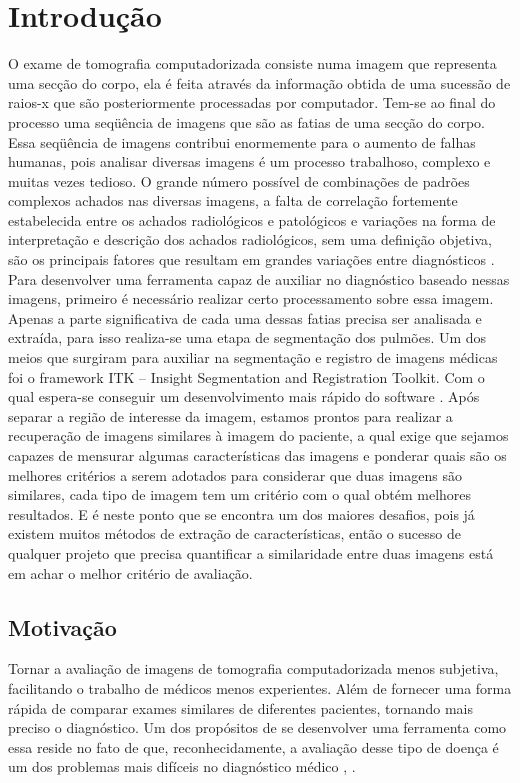 \chapter{Introdução}

O exame de tomografia computadorizada consiste numa imagem que representa uma secção do corpo, ela é feita através da informação obtida de uma sucessão de raios-x que são posteriormente processadas por computador. Tem-se ao final do processo uma seqüência de imagens que são as fatias de uma secção do corpo. Essa seqüência de imagens contribui enormemente para o aumento de falhas humanas, pois analisar diversas imagens é um processo trabalhoso, complexo e muitas vezes tedioso. O grande número possível de combinações de padrões complexos achados nas diversas imagens, a falta de correlação fortemente estabelecida entre os achados radiológicos e patológicos e variações na forma de interpretação e descrição dos achados radiológicos, sem uma definição objetiva, são os principais fatores que resultam em grandes variações entre diagnósticos \cite{uchiyama}.
Para desenvolver uma ferramenta capaz de auxiliar no diagnóstico baseado nessas imagens, primeiro é necessário realizar certo processamento sobre essa imagem. Apenas a parte significativa de cada uma dessas fatias precisa ser analisada e extraída, para isso realiza-se uma etapa de segmentação dos pulmões. Um dos meios que surgiram para auxiliar na segmentação e registro de imagens médicas foi o framework ITK – Insight Segmentation and Registration Toolkit. Com o qual espera-se conseguir um desenvolvimento mais rápido do software \cite{yoo}.
Após separar a região de interesse da imagem, estamos prontos para realizar a recuperação de imagens similares à imagem do paciente, a qual exige que sejamos capazes de mensurar algumas características das imagens e ponderar quais são os melhores critérios a serem adotados para considerar que duas imagens são similares, cada tipo de imagem tem um critério com o qual obtém melhores resultados. E é neste ponto que se encontra um dos maiores desafios, pois já existem muitos métodos de extração de características, então o sucesso de qualquer projeto que precisa quantificar a similaridade entre duas imagens está em achar o melhor critério de avaliação.

\section{Motivação}

Tornar a avaliação de imagens de tomografia computadorizada menos subjetiva, facilitando o trabalho de médicos menos experientes. Além de fornecer uma forma rápida de comparar exames similares de diferentes pacientes, tornando mais preciso o diagnóstico. Um dos propósitos de se desenvolver uma ferramenta como essa reside no fato de que, reconhecidamente, a avaliação desse tipo de doença é um dos problemas mais difíceis no diagnóstico médico \cite{doi}, \cite{bick}.

